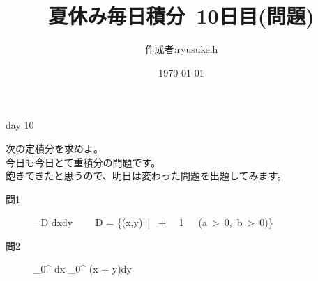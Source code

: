 \documentclass[12pt,a4paper]{jsarticle}
\title{夏休み毎日積分~10日目(問題)}
\date{\today}
\begin{document}
\maketitle
\begin{flushright}
    \author{作成者:ryusuke.h}
\end{flushright}
\begin{itembox}[c]{day 10 }
    \begin{center}
        次の定積分を求めよ。\\
        今日も今日とて重積分の問題です。\\
        飽きてきたと思うので、明日は変わった問題を出題してみます。
    \end{center}
\end{itembox}

\begin{description}
    \item [問1] {\displaystyle} \iint_D dxdy ~~~~D = \left\{(x,y)~|~ + ~\leqq~1~~~(a~>~0,~b~>~0)\right\}
\end{description}

\begin{description}
    \item [問2] {\displaystyle} \int_0^{} dx \int_0^{} \sin(x + y)dy 
\end{description}
\end{document}
